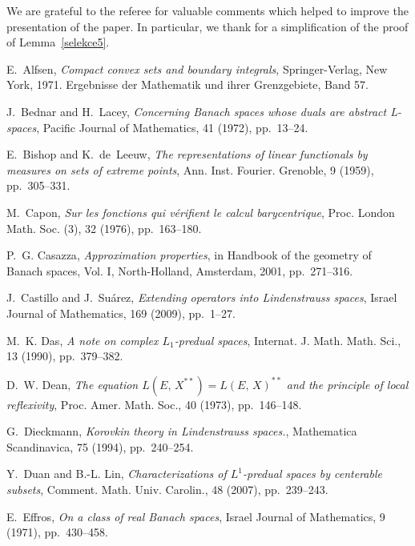\documentclass{amsart}
\numberwithin{equation}{section}
\theoremstyle{definition}
\begin{document}
We are grateful to the referee for valuable comments which helped to improve the presentation
of the paper. In particular, we thank for a simplification of the proof of Lemma~\ref{selekce5}.

%
\begin{thebibliography}{10}

{\sc E.~Alfsen}, {\em Compact convex sets and boundary integrals},
  Springer-Verlag, New York, 1971.
\newblock Ergebnisse der Mathematik und ihrer Grenzgebiete, Band 57.

{\sc J.~Bednar and H.~Lacey}, {\em Concerning {B}anach spaces whose duals are
  abstract {L}-spaces}, Pacific Journal of Mathematics, 41 (1972), pp.~13--24.

{\sc E.~Bishop and K.~de~Leeuw}, {\em The representations of linear functionals
  by measures on sets of extreme points}, Ann. Inst. Fourier. Grenoble, 9
  (1959), pp.~305--331.

{\sc M.~Capon}, {\em Sur les fonctions qui v\'erifient le calcul
  barycentrique}, Proc. London Math. Soc. (3), 32 (1976), pp.~163--180.

{\sc P.~G. Casazza}, {\em Approximation properties}, in Handbook of the
  geometry of {B}anach spaces, {V}ol. {I}, North-Holland, Amsterdam, 2001,
  pp.~271--316.

{\sc J.~Castillo and J.~Su{\'a}rez}, {\em Extending operators into
  {L}indenstrauss spaces}, Israel Journal of Mathematics, 169 (2009),
  pp.~1--27.

{\sc M.~K. Das}, {\em A note on complex {$L_1$}-predual spaces}, Internat. J.
  Math. Math. Sci., 13 (1990), pp.~379--382.

{\sc D.~W. Dean}, {\em The equation {$L(E,\,X^{\ast\ast})=L(E,\,X)^{\ast\ast}$}
  and the principle of local reflexivity}, Proc. Amer. Math. Soc., 40 (1973),
  pp.~146--148.

{\sc G.~Dieckmann}, {\em Korovkin theory in {L}indenstrauss spaces.},
  Mathematica Scandinavica, 75 (1994), pp.~240--254.

{\sc Y.~Duan and B.-L. Lin}, {\em Characterizations of {$L^1$}-predual spaces
  by centerable subsets}, Comment. Math. Univ. Carolin., 48 (2007),
  pp.~239--243.

{\sc E.~Effros}, {\em On a class of real {B}anach spaces}, Israel Journal of
  Mathematics, 9 (1971), pp.~430--458.


\end{thebibliography}
\end{document}
